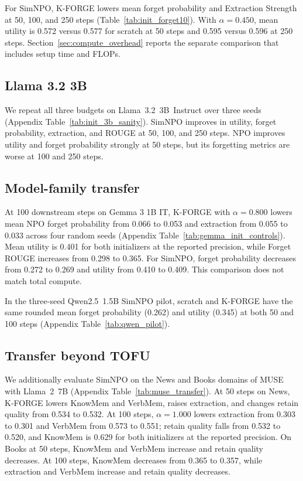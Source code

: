 \documentclass[11pt]{article}
\begin{document}
For SimNPO, K-FORGE lowers mean forget probability and Extraction Strength at 50, 100, and 250 steps (Table~\ref{tab:init_forget10}).
With $\alpha=0.450$, mean utility is 0.572 versus 0.577 for scratch at 50 steps and 0.595 versus 0.596 at 250 steps.
Section~\ref{sec:compute_overhead} reports the separate comparison that includes setup time and FLOPs.


\subsection{Llama 3.2 3B}
We repeat all three budgets on Llama~3.2~3B~Instruct over three seeds (Appendix Table~\ref{tab:init_3b_sanity}). SimNPO improves in utility, forget probability, extraction, and ROUGE at 50, 100, and 250 steps. NPO improves utility and forget probability strongly at 50 steps, but its forgetting metrics are worse at 100 and 250 steps.

\subsection{Model-family transfer}

At 100 downstream steps on Gemma 3 1B IT, K-FORGE with $\alpha=0.800$ lowers mean NPO forget probability from 0.066 to 0.053 and extraction from 0.055 to 0.033 across four random seeds (Appendix Table~\ref{tab:gemma_init_controls}).
Mean utility is 0.401 for both initializers at the reported precision, while Forget ROUGE increases from 0.298 to 0.365. For SimNPO, forget probability decreases from 0.272 to 0.269 and utility from 0.410 to 0.409. This comparison does not match total compute.

In the three-seed Qwen2.5~1.5B SimNPO pilot, scratch and K-FORGE have the same rounded mean forget probability (0.262) and utility (0.345) at both 50 and 100 steps (Appendix Table~\ref{tab:qwen_pilot}).


\subsection{Transfer beyond TOFU}
We additionally evaluate SimNPO on the News and Books domains of MUSE with Llama~2~7B (Appendix Table~\ref{tab:muse_transfer}).
At 50 steps on News, K-FORGE lowers KnowMem and VerbMem, raises extraction, and changes retain quality from 0.534 to 0.532. At 100 steps, $\alpha=1.000$ lowers extraction from 0.303 to 0.301 and VerbMem from 0.573 to 0.551; retain quality falls from 0.532 to 0.520, and KnowMem is 0.629 for both initializers at the reported precision. On Books at 50 steps, KnowMem and VerbMem increase and retain quality decreases. At 100 steps, KnowMem decreases from 0.365 to 0.357, while extraction and VerbMem increase and retain quality decreases.
\end{document}
